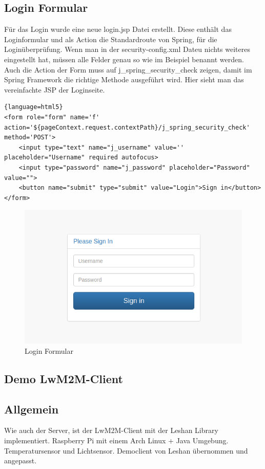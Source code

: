 \subsection{Login Formular}
Für das Login wurde eine neue login.jsp Datei erstellt. Diese enthält das Loginformular und als Action die Standardroute von Spring, für die Loginüberprüfung. Wenn man in der security-config.xml Dateu nichts weiteres eingestellt hat, müssen alle Felder genau so wie im Beispiel benannt werden. Auch die Action der Form muss auf j\_spring\_security\_check zeigen, damit im Spring Framework die richtige Methode ausgeführt wird. Hier sieht man das vereinfachte JSP der Loginseite.
\begin{lstlisting}{language=html5}
<form role="form" name='f' action='${pageContext.request.contextPath}/j_spring_security_check' method='POST'>
	<input type="text" name="j_username" value='' placeholder="Username" required autofocus>
	<input type="password" name="j_password" placeholder="Password" value="">
	<button name="submit" type="submit" value="Login">Sign in</button>
</form>
\end{lstlisting}

\begin{figure}[H]
\centering
\includegraphics[scale=0.5]{../04_Realisierung/images/loginform.png}
\caption{Login Formular}
\end{figure}

\newpage

\subsection{Demo LwM2M-Client}
\subsection{Allgemein}
Wie auch der Server, ist der LwM2M-Client mit der Leshan Library implementiert. 
Raspberry Pi mit einem Arch Linux + Java Umgebung.
Temperatursensor und Lichtsensor.
Democlient von Leshan übernommen und angepasst.